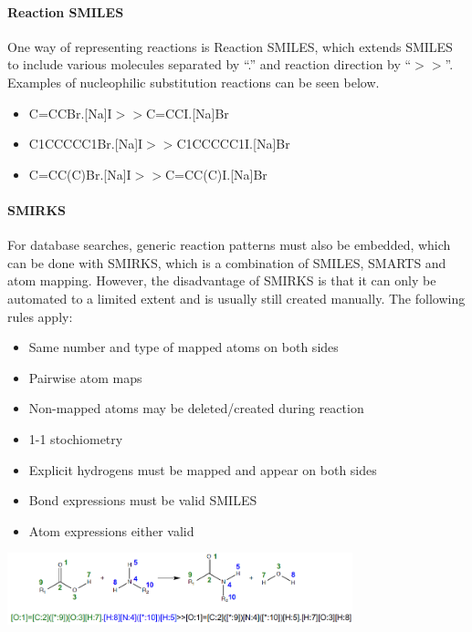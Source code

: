 \paragraph{Reaction SMILES}
One way of representing reactions is Reaction SMILES, which extends SMILES to include various molecules separated by “.” and reaction direction by “$>>$”. Examples of nucleophilic substitution reactions can be seen below. 

\begin{itemize}
    \item C=CCBr.[Na]I$>>$C=CCI.[Na]Br
    \item C1CCCCC1Br.[Na]I$>>$C1CCCCC1I.[Na]Br
    \item C=CC(C)Br.[Na]I$>>$C=CC(C)I.[Na]Br
\end{itemize}

\paragraph{SMIRKS}
For database searches, generic reaction patterns must also be embedded, which can be done with SMIRKS, which is a combination of SMILES, SMARTS and atom mapping. However, the disadvantage of SMIRKS is that it can only be automated to a limited extent and is usually still created manually. The following rules apply:

\begin{itemize}
    \item Same number and type of mapped atoms on both sides
    \item Pairwise atom maps
    \item Non-mapped atoms may be deleted/created during reaction
    \item 1-1 stochiometry
    \item Explicit hydrogens must be mapped and appear on both sides
    \item Bond expressions must be valid SMILES
    \item Atom expressions either valid
\end{itemize}

\begin{center}\includegraphics[width=0.75\textwidth]{img/cheminformatics/ChemicalReactionsSmirks.png}\end{center}

